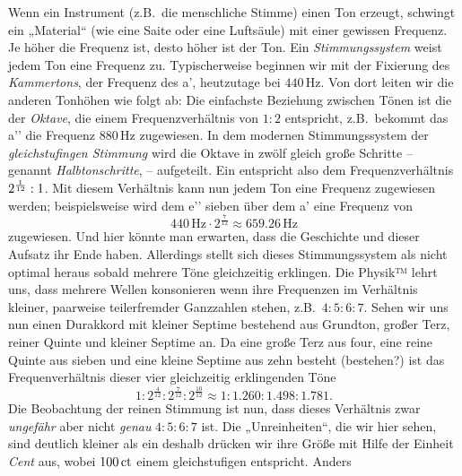 \documentclass[british,11pt]{scrartcl}
\begin{document}
Wenn ein Instrument (z.B.\ die menschliche Stimme) einen Ton erzeugt, schwingt
ein „Material“ (wie eine Saite oder eine Luftsäule) mit einer gewissen Frequenz.
Je höher die Frequenz ist, desto höher ist der Ton. Ein \emph{Stimmungssystem}
weist jedem Ton eine Frequenz zu. Typischerweise beginnen wir mit der Fixierung
des \emph{Kammertons}, der Frequenz des a’, heutzutage bei $440$\,Hz. Von dort
leiten wir die anderen Tonhöhen wie folgt ab: Die einfachste Beziehung zwischen
Tönen ist die der \emph{Oktave}, die einem Frequenzverhältnis von $1:2$
entspricht, z.B.\ bekommt das a’’ die Frequenz $880$\,Hz zugewiesen. In dem
modernen Stimmungssystem der \emph{gleichstufingen Stimmung} wird die Oktave in
zwölf gleich große Schritte – genannt \emph{Halbtonschritte},  – 
aufgeteilt. Ein  entspricht also dem Frequenzverhältnis
$2^{\smash{\frac1{12}}}:1$. Mit diesem Verhältnis kann nun jedem Ton eine
Frequenz zugewiesen werden; beispielsweise wird dem e’’ sieben 
über dem a’ eine Frequenz von 
\[440\,\text{Hz}\cdot 2^{\frac7{12}} \approx 659.26\,\text{Hz}\] zugewiesen. Und
hier könnte man erwarten, dass die Geschichte und dieser Aufsatz ihr Ende
haben. Allerdings stellt sich dieses Stimmungssystem als nicht optimal heraus
sobald mehrere Töne gleichzeitig erklingen. Die Physik™ lehrt uns, dass mehrere
Wellen konsonieren wenn ihre Frequenzen im Verhältnis kleiner, paarweise
teilerfremder Ganzzahlen stehen, z.B.\ $4:5:6:7$. Sehen wir uns nun einen
Durakkord mit kleiner Septime bestehend aus Grundton, großer Terz, reiner Quinte
und kleiner Septime an. Da eine große Terz aus four, eine reine Quinte aus
sieben und eine kleine Septime aus zehn  besteht (bestehen?)
ist das Frequenverhältnis dieser vier gleichzeitig erklingenden Töne
\[1:2^{\frac4{12}}:2^{\frac7{12}}:2^{\frac{10}{12}}\approx
1:1.260:1.498:1.781.\]%
Die Beobachtung der reinen Stimmung ist nun, dass dieses Verhältnis zwar
\emph{ungefähr} aber nicht \emph{genau} $4:5:6:7$ ist.
Die „Unreinheiten“, die wir hier sehen, sind deutlich kleiner als ein
 deshalb drücken wir ihre Größe mit Hilfe der Einheit \emph{Cent} aus,
wobei $100\,\mathrm{ct}$ einem gleichstufigen  entspricht. Anders
\end{document}
